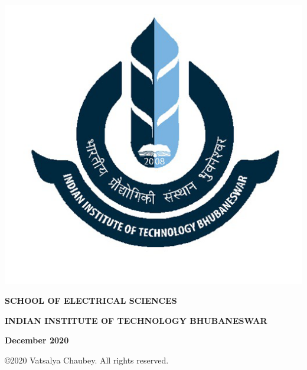 \begin{titlepage}
\begin{center}
\includegraphics[scale=0.3]{iitbbs}
\end{center}
 \vspace{-1em}
\begin{center}
 \textbf{\small SCHOOL OF ELECTRICAL SCIENCES}
\end{center}
 \vspace{-3em}
\begin{center}
 \textbf{\small INDIAN INSTITUTE OF TECHNOLOGY BHUBANESWAR} 
\end{center}
 \vspace{-3em}
\begin{center}
 \textbf{December 2020}
\end{center}
 \vspace{-3em}
\begin{center}
 \copyright 2020 Vatsalya Chaubey. All rights reserved.
\end{center}
\cleardoublepage

\end{titlepage}

